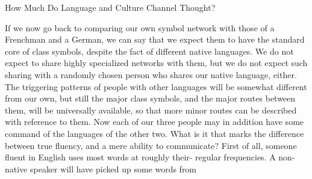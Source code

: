               How Much Do Language and Culture Channel Thought?

If we now go back to comparing our own symbol network with those of a Frenchman and
a German, we can say that we expect them to have the standard core of class symbols,
despite the fact of different native languages. We do not expect to share highly
specialized networks with them, but we do not expect such sharing with a randomly
chosen person who shares our native language, either. The triggering patterns of people
with other languages will be somewhat different from our own, but still the major class
symbols, and the major routes between them, will be universally available, so that more
minor routes can be described with reference to them.
        Now each of our three people may in addition have some command of the
languages of the other two. What is it that marks the difference between true fluency, and
a mere ability to communicate? First of all, someone fluent in English uses most words at
roughly their- regular frequencies. A non-native speaker will have picked up some words
from






